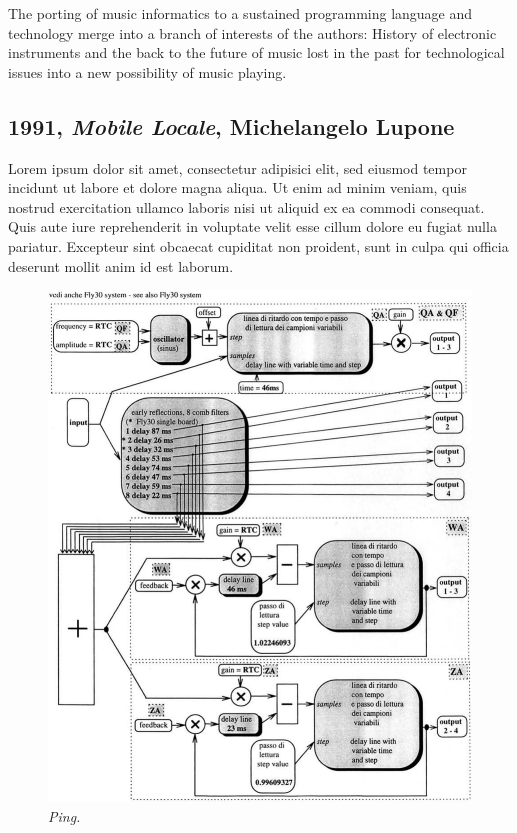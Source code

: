 \documentclass[twoside,a4paper]{article}
\begin{document}
The porting of music informatics to a sustained programming language and technology merge into a branch of interests of the authors: History of electronic instruments and the back to the future of music lost in the past for technological issues into a new possibility of music playing. 


\subsection{1991, \emph{Mobile Locale}, Michelangelo Lupone}

Lorem ipsum dolor sit amet, consectetur adipisici elit, sed eiusmod tempor
incidunt ut labore et dolore magna aliqua. Ut enim ad minim veniam, quis
nostrud exercitation ullamco laboris nisi ut aliquid ex ea commodi consequat.
Quis aute iure reprehenderit in voluptate velit esse cillum dolore eu fugiat
nulla pariatur. Excepteur sint obcaecat cupiditat non proident, sunt in culpa
qui officia deserunt mollit anim id est laborum.

\begin{figure}[ht]
\centerline{\includegraphics[scale=0.5]{img/1-comp}}
\caption{\label{fft_plot}{\it Ping.}}
\end{figure}
\end{document}
